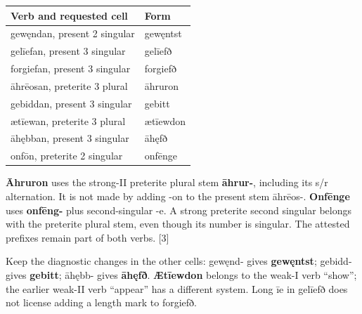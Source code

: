 \par\begingroup
\fontsize{10.5}{13.2}\selectfont
\setlength{\LTleft}{0pt}\setlength{\LTright}{\fill}
\noindent
\begin{tabular}{@{}>{\raggedright\arraybackslash}p{78.74mm}>{\raggedright\arraybackslash}p{42.45mm}@{}}
\toprule
\textbf{Verb and requested cell} & \textbf{Form} \\
\midrule
gewęndan, present 2 singular & gewęntst \\
gelīefan, present 3 singular & gelīefð \\
forgiefan, present 3 singular & forgiefð \\
āhrēosan, preterite 3 plural & āhruron \\
gebiddan, present 3 singular & gebitt \\
ætīewan, preterite 3 plural & ætīewdon \\
āhębban, present 3 singular & āhęfð \\
onfōn, preterite 2 singular & onfēnge \\
\bottomrule
\end{tabular}
\par\endgroup

\textbf{Āhruron} uses the strong-II preterite plural stem \textbf{āhrur-}, including its s/\allowbreak{}r alternation. It is not made by adding -on to the present stem āhrēos-. \textbf{Onfēnge} uses \textbf{onfēng-} plus second-singular -e. A strong preterite second singular belongs with the preterite plural stem, even though its number is singular. The attested prefixes remain part of both verbs. [3]

Keep the diagnostic changes in the other cells: gewęnd- gives \textbf{gewęntst}; gebidd- gives \textbf{gebitt}; āhębb- gives \textbf{āhęfð}. \textbf{Ætīewdon} belongs to the weak-I verb “show”; the earlier weak-II verb “appear” has a different system. Long īe in gelīefð does not license adding a length mark to forgiefð.

